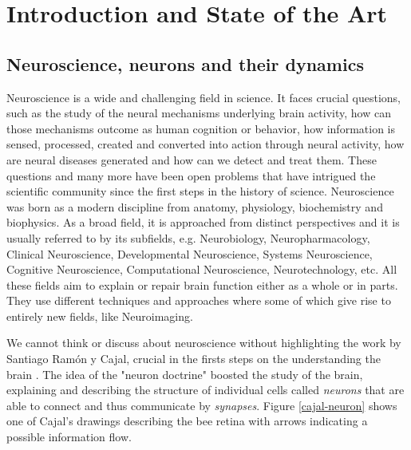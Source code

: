 \chapter{Introduction and State of the Art}
\label{c-intro}

\section{Neuroscience, neurons and their dynamics}
Neuroscience is a wide and challenging field in science. It faces crucial questions, such as the study of the neural mechanisms underlying brain activity, how can those mechanisms outcome as human cognition or behavior, how information is sensed, processed, created and converted into action through neural activity, how are neural diseases generated and how can we detect and treat them. 
These questions and many more have been open problems that have intrigued the scientific community since the first steps in the history of science. Neuroscience was born as a modern discipline from anatomy, physiology, biochemistry and biophysics. As a broad field, it is approached from distinct perspectives and it is usually referred to by its subfields, e.g. Neurobiology, Neuropharmacology, Clinical Neuroscience, Developmental Neuroscience, Systems Neuroscience, Cognitive Neuroscience, Computational Neuroscience, Neurotechnology, etc. All these fields aim to explain or repair brain function either as a whole or in parts. They use different techniques and approaches where some of which give rise to entirely new fields, like Neuroimaging.

We cannot think or discuss about neuroscience without highlighting the work by Santiago Ramón y Cajal, crucial in the firsts steps on the understanding the brain  \parencite{ramonycajal_textura_1899,decarlos_historical_2007,decastro_editorial_2016,delgado-garcia_cajal_2015,decastro_cajal_2019}. The idea of the "neuron doctrine" boosted the study of the brain, explaining and describing the structure of individual cells called \textit{neurons} that are able to connect and thus communicate by \textit{synapses}. Figure \ref{cajal-neuron} shows one of Cajal's drawings describing the bee retina with arrows indicating a possible information flow.

